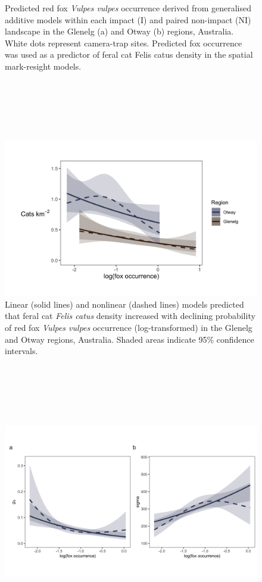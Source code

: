\documentclass[11pt,a4paper,titlepage,twoside,openright]{style/unimelbthesis}
\begin{document}
\begin{mainmatter}
\begin{figure}
{}

\caption{Predicted red fox \textit{Vulpes vulpes} occurrence derived from generalised additive models within each impact (I) and paired non-impact (NI) landscape in the Glenelg (a) and Otway (b) regions, Australia. White dots represent camera-trap sites. Predicted fox occurrence was used as a predictor of feral cat Felis catus density in the spatial mark-resight models.}\label{fig:foxplot}
\end{figure}
\newpage

\(~\)

\(~\)

\(~\)
\begin{figure}

{\centering \includegraphics[width=1\linewidth]{figure/c3/foxD_600dpi} 

}

\caption{Linear (solid lines) and nonlinear (dashed lines) models predicted that feral cat \textit{Felis catus} density increased with declining probability of red fox \textit{Vulpes vulpes} occurrence (log-transformed) in the Glenelg and Otway regions, Australia. Shaded areas indicate 95\% confidence intervals.}\label{fig:dcor}
\end{figure}
\newpage

\(~\)

\(~\)

\(~\)
\begin{figure}

{\centering \includegraphics[width=1\linewidth]{figure/c3/foxDet_otways_600dpi} 

}
\end{figure}
\end{mainmatter}
\end{document}
